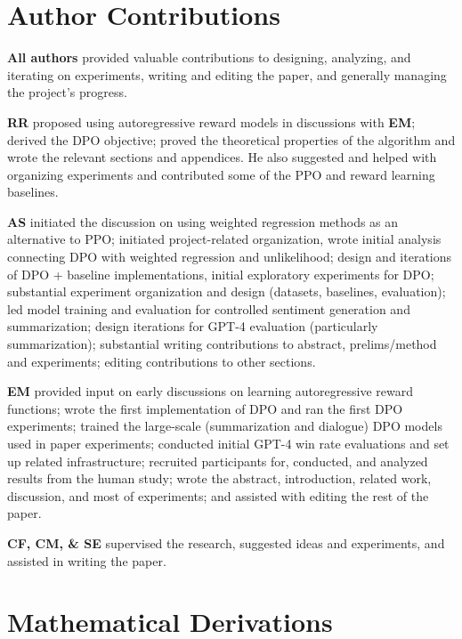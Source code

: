 \documentclass{article}
\begin{document}



\newpage
\appendix
\section*{Author Contributions}
\textbf{All authors} provided valuable contributions to designing, analyzing, and iterating on experiments, writing and editing the paper, and generally managing the project’s progress.

\textbf{RR} proposed using autoregressive reward models in discussions with \textbf{EM}; derived the DPO objective; proved the theoretical properties of the algorithm and wrote the relevant sections and appendices. He also suggested and helped with organizing experiments and contributed some of the PPO and reward learning baselines.

\textbf{AS} initiated the discussion on using weighted regression methods as an alternative to PPO;
initiated project-related organization, wrote initial analysis connecting DPO with weighted regression and unlikelihood; design and iterations of DPO + baseline implementations, initial exploratory experiments for DPO; substantial experiment organization and design (datasets, baselines, evaluation); led model training and evaluation for controlled sentiment generation and summarization; design iterations for GPT-4 evaluation (particularly summarization); substantial writing contributions to abstract, prelims/method and experiments; editing contributions to other sections.

\textbf{EM} provided input on early discussions on learning autoregressive reward functions; wrote the first implementation of DPO and ran the first DPO experiments; trained the large-scale (summarization and dialogue) DPO models used in paper experiments; conducted initial GPT-4 win rate evaluations and set up related infrastructure; recruited participants for, conducted, and analyzed results from the human study; wrote the abstract, introduction, related work, discussion, and most of experiments; and assisted with editing the rest of the paper.

\textbf{CF, CM, \& SE} supervised the research, suggested ideas and experiments, and assisted in writing the paper.

\section{Mathematical Derivations}
\end{document}
